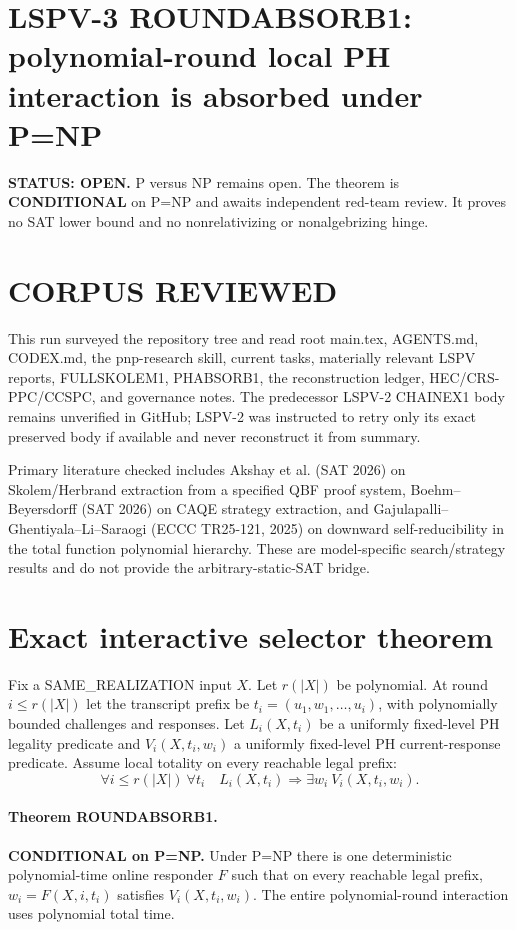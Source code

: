 \documentclass[11pt]{article}
\begin{document}
\section*{LSPV-3 ROUNDABSORB1: polynomial-round local PH interaction is absorbed under P=NP}
\textbf{STATUS: OPEN.} P versus NP remains open. The theorem is \textbf{CONDITIONAL} on P=NP and awaits independent red-team review. It proves no SAT lower bound and no nonrelativizing or nonalgebrizing hinge.

\section*{CORPUS REVIEWED}
This run surveyed the repository tree and read root main.tex, AGENTS.md, CODEX.md, the pnp-research skill, current tasks, materially relevant LSPV reports, FULLSKOLEM1, PHABSORB1, the reconstruction ledger, HEC/CRS-PPC/CCSPC, and governance notes. The predecessor LSPV-2 CHAINEX1 body remains unverified in GitHub; LSPV-2 was instructed to retry only its exact preserved body if available and never reconstruct it from summary.

Primary literature checked includes Akshay et al. (SAT 2026) on Skolem/Herbrand extraction from a specified QBF proof system, Boehm--Beyersdorff (SAT 2026) on CAQE strategy extraction, and Gajulapalli--Ghentiyala--Li--Saraogi (ECCC TR25-121, 2025) on downward self-reducibility in the total function polynomial hierarchy. These are model-specific search/strategy results and do not provide the arbitrary-static-SAT bridge.

\section*{Exact interactive selector theorem}
Fix a SAME\_REALIZATION input $X$. Let $r(|X|)$ be polynomial. At round $i\le r(|X|)$ let the transcript prefix be $t_i=(u_1,w_1,\ldots,u_i)$, with polynomially bounded challenges and responses. Let $L_i(X,t_i)$ be a uniformly fixed-level PH legality predicate and $V_i(X,t_i,w_i)$ a uniformly fixed-level PH current-response predicate. Assume local totality on every reachable legal prefix:
\[
\forall i\le r(|X|)\ \forall t_i\quad L_i(X,t_i)\Rightarrow\exists w_i\ V_i(X,t_i,w_i).
\]
\paragraph{Theorem ROUNDABSORB1.} \textbf{CONDITIONAL on P=NP.} Under P=NP there is one deterministic polynomial-time online responder $F$ such that on every reachable legal prefix, $w_i=F(X,i,t_i)$ satisfies $V_i(X,t_i,w_i)$. The entire polynomial-round interaction uses polynomial total time.
\end{document}
